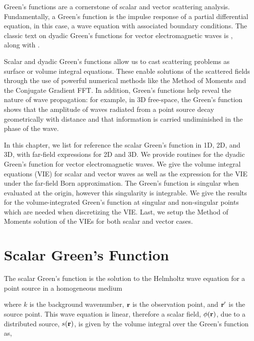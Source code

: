 

Green's functions are a cornerstone of scalar and vector scattering analysis. Fundamentally, a Green's function is the impulse response of a partial differential equation, in this case, a wave equation with associated boundary conditions. The classic text on dyadic Green's functions for vector electromagnetic waves is \cite{tai1994dyadic}, along with \cite{chew1995waves,tsang1985theory}.  

Scalar and dyadic Green's functions allow us to cast scattering problems as surface or volume integral equations. These enable solutions of the scattered fields through the use of powerful numerical methods like the Method of Moments and the Conjugate Gradient FFT. In addition, Green's functions help reveal the nature of wave propagation: for example, in 3D free-space, the Green's function shows that the amplitude of waves radiated from a point source decay geometrically with distance and that information is carried undiminished in the phase of the wave.

In this chapter, we list for reference the scalar Green's function in 1D, 2D, and 3D, with far-field expressions for 2D and 3D. We provide routines for the dyadic Green's function for vector electromagnetic waves. We give the volume integral equations (VIE) for scalar and vector waves as well as the expression for the VIE under the far-field Born approximation. The Green's function is singular when evaluated at the origin, however this singularity is integrable. We give the results for the volume-integrated Green's function at singular and non-singular points which are needed when discretizing the VIE. Last, we setup the Method of Moments solution of the VIEs for both scalar and vector cases.


\section{Scalar Green's Function}

The scalar Green's function is the solution to the Helmholtz wave equation for a point source in a homogeneous medium

\noindent where $k$ is the background wavenumber, $\mathbf{r}$ is the observation point, and  $\mathbf{r}'$ is the source point. This wave equation is linear, therefore a scalar field, $\phi(\mathbf{r})$, due to a distributed source, $s(\mathbf{r})$, is given by the volume integral over the Green's function as, \cite{chew1995waves}

